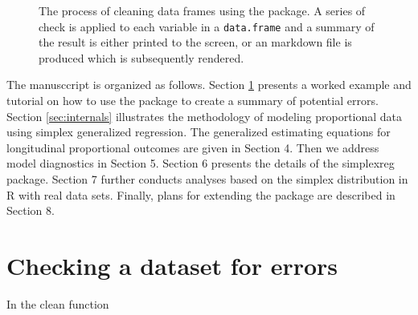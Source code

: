 \documentclass[article]{jss}
\begin{document}
\begin{figure}
\begin{center}
\end{center}
\label{fig:flowchart1}
\caption{The process of cleaning data frames using the 
  package. A series of check is applied to each variable in a
  \texttt{data.frame} and a summary of the result is either printed to
  the screen, or an  markdown file is produced which is
  subsequently rendered.}
\end{figure}


The manusccript is organized as follows. Section \ref{sec:example1}
presents a worked example and tutorial on how to use the 
package to create a summary of potential errors. Section
\ref{sec:internals} illustrates the methodology of modeling
proportional data using simplex generalized regression. The
generalized estimating equations for longitudinal proportional
outcomes are given in Section 4. Then we address model diagnostics in
Section 5. Section 6 presents the details of the simplexreg
package. Section 7 further conducts analyses based on the simplex
distribution in R with real data sets. Finally, plans for extending
the package are described in Section 8.




\section{Checking a dataset for errors} \label{sec:example1}

In  the clean function
\end{document}

